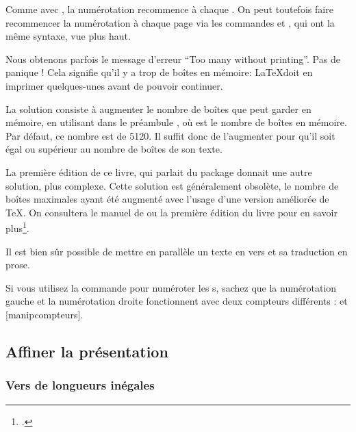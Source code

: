 \begin{attention}
Comme avec , la numérotation recommence à chaque . On peut toutefois faire recommencer la numérotation  à chaque page via les commandes  et , qui ont la même syntaxe, vue plus haut.
\end{attention}

Nous obtenons parfois le message d'erreur \enquote{Too many  without printing}. Pas de panique ! Cela signifie qu'il y a trop de boîtes en mémoire: \LaTeX  doit en imprimer quelques-unes avant de pouvoir continuer. 

La  solution consiste à  augmenter le nombre de boîtes que  peut garder en mémoire, en utilisant dans le préambule , où  est le nombre de boîtes en mémoire. Par défaut, ce nombre est de 5120. Il suffit donc de l'augmenter  pour qu'il soit égal ou supérieur au nombre de boîtes de son  texte. 

\begin{plusloins}
La première édition de ce livre, qui parlait du package  donnait une autre solution, plus complexe. Cette solution est généralement obsolète, le nombre de boîtes maximales ayant été augmenté avec l'usage d'une version améliorée de \TeX. On consultera le manuel de  ou la première édition du livre pour en savoir plus\footcites{eledpar}[176-178]{Rouquette2012}.
\end{plusloins}


\begin{plusloins}
Il est bien sûr possible de mettre en parallèle un texte en vers et sa traduction en prose. 
\end{plusloins}
\begin{plusloins}
Si vous utilisez la commande  pour numéroter les s, sachez que la numérotation gauche et la numérotation droite fonctionnent avec deux compteurs différents :  et [manipcompteurs].
\end{plusloins}




\subsection{Affiner la présentation}


\subsubsection{Vers de longueurs inégales}

